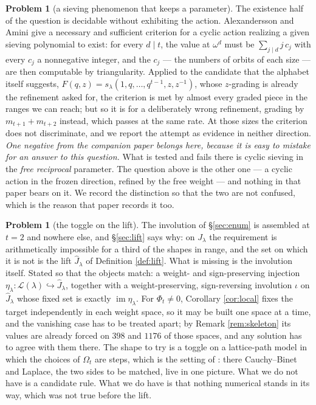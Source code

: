 \documentclass[11pt,reqno]{amsart}
\theoremstyle{plain}
\theoremstyle{definition}
\newtheorem{problem}[theorem]{Problem}
\begin{document}
\begin{problem}[a sieving phenomenon that keeps a parameter]
The existence half of the question is decidable without exhibiting the action. Alexandersson and
Amini \cite{AA19} give a necessary and sufficient criterion for a cyclic action realizing a given
sieving polynomial to exist: for every $d\mid t$, the value at $\omega^d$ must be
$\sum_{j\mid d}j\,c_j$ with every $c_j$ a nonnegative integer, and the $c_j$ --- the numbers of
orbits of each size --- are then computable by triangularity. Applied to the candidate that the
alphabet itself suggests, $F(q,z)=s_\lambda(1,q,\dots,q^{t-1},z,z^{-1})$, whose $z$-grading is
already the refinement asked for, the criterion is met by almost every graded piece in the ranges we
can reach; but so it is for a deliberately wrong refinement, grading by $m_{t+1}+m_{t+2}$ instead,
which passes at the same rate. At those sizes the criterion does not discriminate, and we report the
attempt as evidence in neither direction.
\emph{One negative from the companion paper \cite{PaperII} belongs here, because it is easy to
mistake for an answer to this question.} What is tested and fails there is cyclic sieving in the
\emph{free reciprocal} parameter. The question above is the other one --- a cyclic action in the
frozen direction, refined by the free weight --- and nothing in that paper bears on it. We record the
distinction so that the two are not confused, which is the reason that paper records it too.
\end{problem}

\begin{problem}[the toggle on the lift]\label{prob:toggle}
The involution of \S\ref{sec:enum} is assembled at $t=2$ and nowhere else, and \S\ref{sec:lift} says
why: on $J_\lambda$ the requirement is arithmetically impossible for a third of the shapes in range,
and the set on which it is not is the lift $\widehat J_\lambda$ of Definition \ref{def:lift}. What
is missing is the involution itself. Stated so that the objects match: a weight- and sign-preserving
injection $\eta_\lambda:\mathcal L(\lambda)\hookrightarrow\widehat J_\lambda$, together with a
weight-preserving, sign-reversing involution $\iota$ on $\widehat J_\lambda$ whose fixed set is
exactly $\operatorname{im}\eta_\lambda$. For $\Phi_t\ne0$, Corollary \ref{cor:local} fixes the target
independently in each weight space, so it may be built one space at a time, and the vanishing case
has to be treated apart; by Remark \ref{rem:skeleton} its values are already forced on $398$ and $1176$ of
those spaces, and any solution has to agree with them there. The shape to try is a toggle on a
lattice-path model in which the choices of $\Omega_t$ are steps, which is the setting of
\cite{Fulmek}: there Cauchy--Binet and Laplace, the two sides to be matched, live in one picture.
What we do not have is a candidate rule. What we do have is that nothing numerical stands in its way,
which was not true before the lift.
\end{problem}
\end{document}
